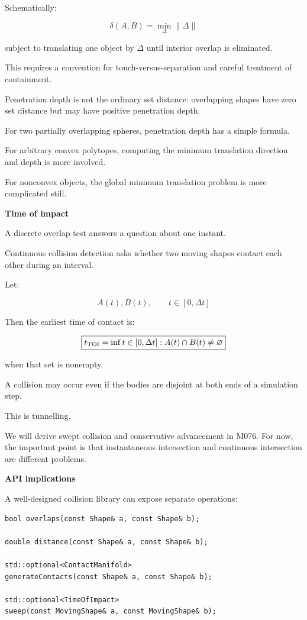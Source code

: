 Schematically:

\[
\boxed{ \delta(A,B)= \min_{\Delta}\|\Delta\| }
\]

subject to translating one object by \(\Delta\) until interior overlap is eliminated.

This requires a convention for touch-versus-separation and careful treatment of containment.

Penetration depth is not the ordinary set distance: overlapping shapes have zero set distance but may have positive penetration depth.

For two partially overlapping spheres, penetration depth has a simple formula.

For arbitrary convex polytopes, computing the minimum translation direction and depth is more involved.

For nonconvex objects, the global minimum translation problem is more complicated still.

\textbf{Time of impact}

A discrete overlap test answers a question about one instant.

Continuous collision detection asks whether two moving shapes contact each other during an interval.

Let:

\[
A(t),B(t),\qquad t\in[0,\Delta t]
\]

Then the earliest time of contact is:

\[
\boxed{ t_{\mathrm{TOI}}= \inf\\{t\in[0,\Delta t]:A(t)\cap B(t)\ne\varnothing\\} }
\]

when that set is nonempty.

A collision may occur even if the bodies are disjoint at both ends of a simulation step.

This is tunnelling.

We will derive swept collision and conservative advancement in M076. For now, the important point is that instantaneous intersection and continuous intersection are different problems.

\textbf{API implications}

A well-designed collision library can expose separate operations:

\begin{verbatim}
bool overlaps(const Shape& a, const Shape& b);

double distance(const Shape& a, const Shape& b);

std::optional<ContactManifold>
generateContacts(const Shape& a, const Shape& b);

std::optional<TimeOfImpact>
sweep(const MovingShape& a, const MovingShape& b);
\end{verbatim}

